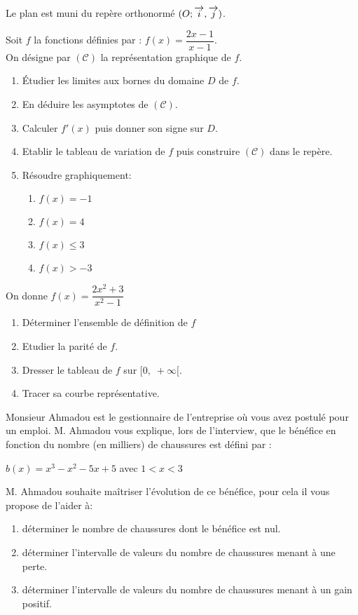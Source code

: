 \begin{exercice}
 Le plan est muni du rep\`ere orthonorm\'e $(O ;\overrightarrow{i},\overrightarrow{j})$. 
 
 Soit $f$ la fonctions d\'efinies par : 
 $f(x)=\dfrac{2x-1}{x-1}$.\\
On d\'esigne par $(\mathscr{C})$  la repr\'esentation graphique  de $f$.
\begin{enumerate}
 \item Étudier les limites aux bornes du domaine $ D $ de  $f$.
 \item En déduire les asymptotes de $(\mathscr{C})$.
 \item Calculer $ f'(x) $ puis donner son signe sur $ D $.
 \item Etablir le tableau de variation de  $f$ puis construire $(\mathscr{C})$ dans le repère.
 \item R\'esoudre graphiquement:
 \begin{enumerate}
\item $f(x)=-1$
\item $f(x)=4$
\item $f(x)\leq  3$
\item $f(x)>-3$
\end{enumerate}
\end{enumerate}
\end{exercice}

\begin{exercice}
On donne $f(x)=\dfrac{2x^2+3}{x^2-1}$
\begin{enumerate}
\item Déterminer l'ensemble de définition de $ f $
\item Etudier la parité de $ f$.
\item Dresser le tableau de $ f $ sur $ [0,\; + \infty[ $.
\item Tracer sa courbe repr\'esentative.
\end{enumerate}
\end{exercice}
\begin{exercice}
Monsieur Ahmadou est le gestionnaire de l'entreprise où vous avez postulé pour un emploi. M. Ahmadou vous
explique, lors de l'interview, que le bénéfice en fonction du nombre (en milliers) de chaussures est défini par :

\medskip
 $ b(x)=x^3-x^2-5x+5 $\; avec \; $ 1<x<3 $

\medskip
M. Ahmadou souhaite maîtriser l'évolution de ce bénéfice, pour cela il vous propose de l'aider à:

\medskip
\begin{enumerate}
\item  déterminer le nombre de chaussures dont le bénéfice est nul.

\item  déterminer  l'intervalle de valeurs du nombre de chaussures menant à une perte.

\item déterminer  l'intervalle de valeurs du nombre de chaussures menant à un gain positif.
\end{enumerate}
\end{exercice}


